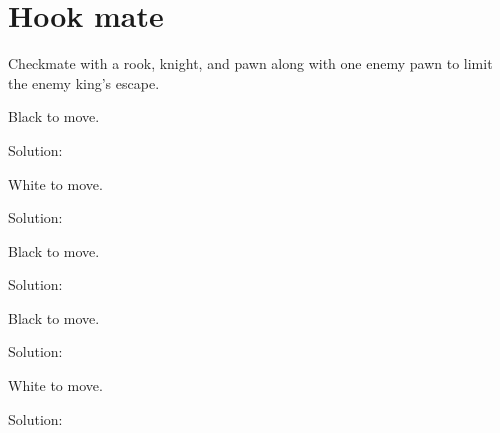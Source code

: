 \documentclass{book}
\begin{document}
\section{Hook mate}
Checkmate with a rook, knight, and pawn along with one enemy pawn to limit the enemy king's escape.\begin{multicols}{2} 
\begin{samepage} 
\newgame 


 
\showboard
 
 Black to move. 
 
Solution: 
 
\end{samepage}\begin{samepage} 
\newgame 


 
\showboard
 
 White to move. 
 
Solution: 
 
\end{samepage}\begin{samepage} 
\newgame 


 
\showboard
 
 Black to move. 
 
Solution: 
 
\end{samepage}\begin{samepage} 
\newgame 


 
\showboard
 
 Black to move. 
 
Solution: 
 
\end{samepage}\begin{samepage} 
\newgame 


 
\showboard
 
 White to move. 
 
Solution: 
 
\end{samepage}\end{multicols} 
\newpage 
\end{document}
